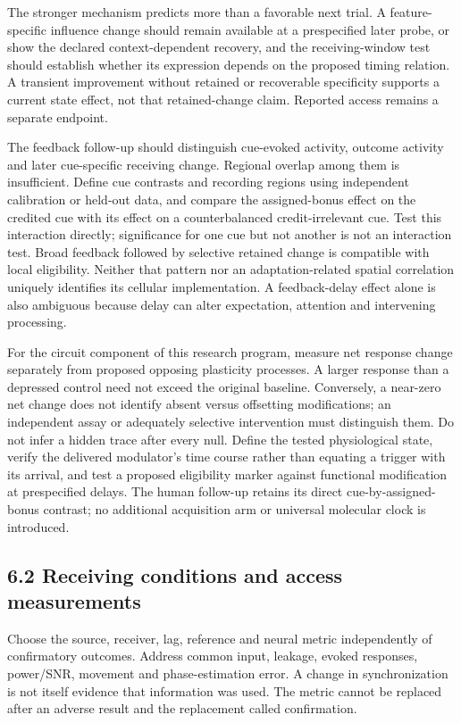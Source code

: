 \documentclass[
  american,
  11pt,
  letterpaper,
]{article}
\begin{document}
The stronger mechanism predicts more than a favorable next trial. A feature-specific influence change should remain available at a prespecified later probe, or show the declared context-dependent recovery, and the receiving-window test should establish whether its expression depends on the proposed timing relation. A transient improvement without retained or recoverable specificity supports a current state effect, not that retained-change claim. Reported access remains a separate endpoint.

The feedback follow-up should distinguish cue-evoked activity, outcome activity and later cue-specific receiving change. Regional overlap among them is insufficient. Define cue contrasts and recording regions using independent calibration or held-out data, and compare the assigned-bonus effect on the credited cue with its effect on a counterbalanced credit-irrelevant cue. Test this interaction directly; significance for one cue but not another is not an interaction test. Broad feedback followed by selective retained change is compatible with local eligibility. Neither that pattern nor an adaptation-related spatial correlation uniquely identifies its cellular implementation. A feedback-delay effect alone is also ambiguous because delay can alter expectation, attention and intervening processing.

For the circuit component of this research program, measure net response change separately from proposed opposing plasticity processes. A larger response than a depressed control need not exceed the original baseline. Conversely, a near-zero net change does not identify absent versus offsetting modifications; an independent assay or adequately selective intervention must distinguish them. Do not infer a hidden trace after every null. Define the tested physiological state, verify the delivered modulator's time course rather than equating a trigger with its arrival, and test a proposed eligibility marker against functional modification at prespecified delays. The human follow-up retains its direct cue-by-assigned-bonus contrast; no additional acquisition arm or universal molecular clock is introduced.

\subsection{6.2 Receiving conditions and access measurements}\label{receiving-conditions-and-access-measurements}

Choose the source, receiver, lag, reference and neural metric independently of confirmatory outcomes. Address common input, leakage, evoked responses, power/SNR, movement and phase-estimation error. A change in synchronization is not itself evidence that information was used. The metric cannot be replaced after an adverse result and the replacement called confirmation.
\end{document}
